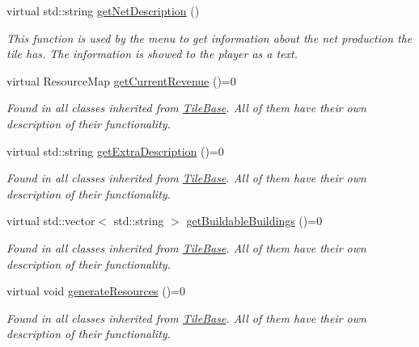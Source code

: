 \begin{DoxyCompactItemize}
virtual std\-::string \hyperlink{class_course_1_1_tile_base_a602eabff37145bdbac5ed66f8909bcd1}{get\-Net\-Description} ()
\begin{DoxyCompactList}\small\item\em This function is used by the menu to get information about the net production the tile has. The information is showed to the player as a text. \end{DoxyCompactList}\item 
\hypertarget{class_course_1_1_tile_base_a07b6e0ed40f3a99bc7997fbba0435bbd}{virtual Resource\-Map \hyperlink{class_course_1_1_tile_base_a07b6e0ed40f3a99bc7997fbba0435bbd}{get\-Current\-Revenue} ()=0}\label{class_course_1_1_tile_base_a07b6e0ed40f3a99bc7997fbba0435bbd}

\begin{DoxyCompactList}\small\item\em Found in all classes inherited from \hyperlink{class_course_1_1_tile_base}{Tile\-Base}. All of them have their own description of their functionality. \end{DoxyCompactList}\item 
\hypertarget{class_course_1_1_tile_base_afbf2d7533a9da7492f360b53a11d1432}{virtual std\-::string \hyperlink{class_course_1_1_tile_base_afbf2d7533a9da7492f360b53a11d1432}{get\-Extra\-Description} ()=0}\label{class_course_1_1_tile_base_afbf2d7533a9da7492f360b53a11d1432}

\begin{DoxyCompactList}\small\item\em Found in all classes inherited from \hyperlink{class_course_1_1_tile_base}{Tile\-Base}. All of them have their own description of their functionality. \end{DoxyCompactList}\item 
\hypertarget{class_course_1_1_tile_base_aa268376209fba52b45b4aa7c8a7baf06}{virtual std\-::vector$<$ std\-::string $>$ \hyperlink{class_course_1_1_tile_base_aa268376209fba52b45b4aa7c8a7baf06}{get\-Buildable\-Buildings} ()=0}\label{class_course_1_1_tile_base_aa268376209fba52b45b4aa7c8a7baf06}

\begin{DoxyCompactList}\small\item\em Found in all classes inherited from \hyperlink{class_course_1_1_tile_base}{Tile\-Base}. All of them have their own description of their functionality. \end{DoxyCompactList}\item 
\hypertarget{class_course_1_1_tile_base_a811c64342542fededc8e0dde4680410f}{virtual void \hyperlink{class_course_1_1_tile_base_a811c64342542fededc8e0dde4680410f}{generate\-Resources} ()=0}\label{class_course_1_1_tile_base_a811c64342542fededc8e0dde4680410f}

\begin{DoxyCompactList}\small\item\em Found in all classes inherited from \hyperlink{class_course_1_1_tile_base}{Tile\-Base}. All of them have their own description of their functionality. \end{DoxyCompactList}\end{DoxyCompactItemize}
